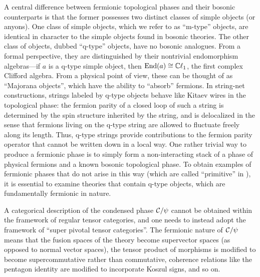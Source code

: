 A central difference between fermionic topological phases and their bosonic counterparts is that 
the former possesses two distinct classes of simple objects (or anyons). 
One class of simple objects, which we refer to as ``m-type'' objects, are identical in character
to the simple objects found in bosonic theories. 
The other class of objects, dubbed ``q-type'' objects, have no bosonic analogues. 
From a formal perspective, they are distinguished by their nontrivial endomorphism algebras---if 
$a$ is a q-type simple object, then $\text{End}(a) \cong \mathbb{C}\ell_1$, the first complex Clifford algebra. 
From a physical point of view, these can be thought of as ``Majorana objects'', which have the ability 
to ``absorb'' fermions. 
In string-net constructions, strings labeled by q-type objects behave like Kitaev wires in the 
topological phase: the fermion parity of a closed loop of such a string is determined by 
the spin structure inherited by the string, and is delocalized in the sense that fermions living on the q-type string are allowed to fluctuate freely along its length.
Thus, q-type strings provide contributions to the fermion parity operator that cannot be written down 
in a local way. 
One rather trivial way to produce a fermionic phase is to simply form a non-interacting stack of a phase of physical fermions 
and a known bosonic topological phase. 
To obtain examples of fermionic phases that do not arise in this way (which are called ``primitive'' in \cite{Lan2016b}),
it is essential to examine theories that contain q-type objects, which are fundamentally fermionic in nature. 

A categorical description of the condensed phase $\mathcal{C} / \psi$ cannot be obtained within the framework 
of regular tensor categories, and one needs to instead adopt the framework of ``super pivotal tensor categories''. 
The fermionic nature of $\mathcal{C} / \psi$ means that the fusion spaces of the theory become supervector spaces 
(as opposed to normal vector spaces),
the tensor product of morphisms is modified to become supercommutative rather than commutative, 
coherence relations like the pentagon identity are modified to incorporate Koszul signs, and so on.

